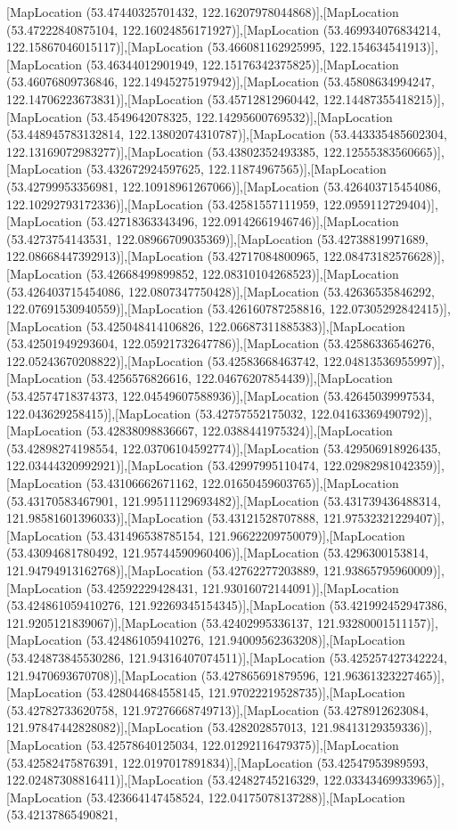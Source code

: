 [MapLocation (53.47440325701432, 122.16207978044868)],[MapLocation (53.47222840875104, 122.16024856171927)],[MapLocation (53.469934076834214, 122.15867046015117)],[MapLocation (53.466081162925995, 122.154634541913)],[MapLocation (53.46344012901949, 122.15176342375825)],[MapLocation (53.46076809736846, 122.14945275197942)],[MapLocation (53.45808634994247, 122.14706223673831)],[MapLocation (53.45712812960442, 122.14487355418215)],[MapLocation (53.4549642078325, 122.14295600769532)],[MapLocation (53.448945783132814, 122.13802074310787)],[MapLocation (53.443335485602304, 122.13169072983277)],[MapLocation (53.43802352493385, 122.12555383560665)],[MapLocation (53.432672924597625, 122.11874967565)],[MapLocation (53.42799953356981, 122.10918961267066)],[MapLocation (53.426403715454086, 122.10292793172336)],[MapLocation (53.42581557111959, 122.0959112729404)],[MapLocation (53.42718363343496, 122.09142661946746)],[MapLocation (53.4273754143531, 122.08966709035369)],[MapLocation (53.42738819971689, 122.08668447392913)],[MapLocation (53.42717084800965, 122.08473182576628)],[MapLocation (53.42668499899852, 122.08310104268523)],[MapLocation (53.426403715454086, 122.0807347750428)],[MapLocation (53.42636535846292, 122.07691530940559)],[MapLocation (53.426160787258816, 122.07305292842415)],[MapLocation (53.425048414106826, 122.06687311885383)],[MapLocation (53.42501949293604, 122.05921732647786)],[MapLocation (53.42586336546276, 122.05243670208822)],[MapLocation (53.42583668463742, 122.04813536955997)],[MapLocation (53.4256576826616, 122.04676207854439)],[MapLocation (53.42574718374373, 122.04549607588936)],[MapLocation (53.42645039997534, 122.043629258415)],[MapLocation (53.42757552175032, 122.04163369490792)],[MapLocation (53.42838098836667, 122.0388441975324)],[MapLocation (53.42898274198554, 122.03706104592774)],[MapLocation (53.429506918926435, 122.03444320992921)],[MapLocation (53.42997995110474, 122.02982981042359)],[MapLocation (53.43106662671162, 122.01650459603765)],[MapLocation (53.43170583467901, 121.99511129693482)],[MapLocation (53.431739436488314, 121.98581601396033)],[MapLocation (53.43121528707888, 121.97532321229407)],[MapLocation (53.431496538785154, 121.96622209750079)],[MapLocation (53.43094681780492, 121.95744590960406)],[MapLocation (53.4296300153814, 121.94794913162768)],[MapLocation (53.42762277203889, 121.93865795960009)],[MapLocation (53.42592229428431, 121.93016072144091)],[MapLocation (53.424861059410276, 121.92269345154345)],[MapLocation (53.421992452947386, 121.9205121839067)],[MapLocation (53.42402995336137, 121.93280001511157)],[MapLocation (53.424861059410276, 121.94009562363208)],[MapLocation (53.424873845530286, 121.94316407074511)],[MapLocation (53.425257427342224, 121.9470693670708)],[MapLocation (53.427865691879596, 121.96361323227465)],[MapLocation (53.428044684558145, 121.97022219528735)],[MapLocation (53.42782733620758, 121.97276668749713)],[MapLocation (53.4278912623084, 121.97847442828082)],[MapLocation (53.428202857013, 121.98413129359336)],[MapLocation (53.42578640125034, 122.01292116479375)],[MapLocation (53.42582475876391, 122.0197017891834)],[MapLocation (53.42547953989593, 122.02487308816411)],[MapLocation (53.42482745216329, 122.03343469933965)],[MapLocation (53.423664147458524, 122.04175078137288)],[MapLocation (53.42137865490821, 
